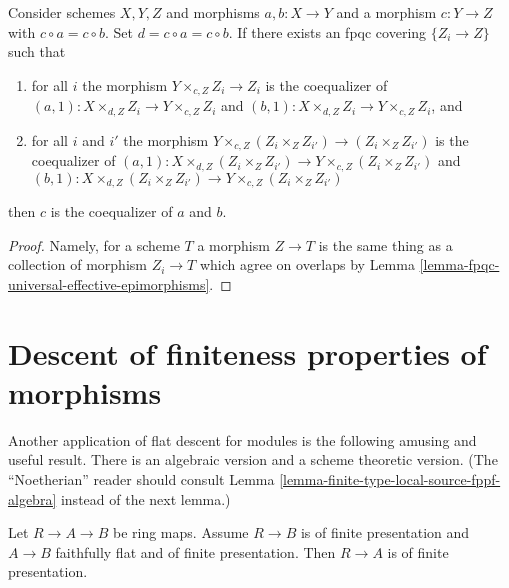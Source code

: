 \begin{lemma}
\label{lemma-coequalizer-fpqc-local}
Consider schemes $X, Y, Z$ and morphisms $a, b : X \to Y$ and
a morphism $c : Y \to Z$ with $c \circ a = c \circ b$. Set
$d = c \circ a = c \circ b$. If there exists an
fpqc covering $\{Z_i \to Z\}$ such that
\begin{enumerate}
\item for all $i$ the morphism $Y \times_{c, Z} Z_i \to Z_i$
is the coequalizer of $(a, 1) : X \times_{d, Z} Z_i \to Y \times_{c, Z} Z_i$
and $(b, 1) : X \times_{d, Z} Z_i \to Y \times_{c, Z} Z_i$, and
\item for all $i$ and $i'$ the morphism
$Y \times_{c, Z} (Z_i \times_Z Z_{i'}) \to (Z_i \times_Z Z_{i'})$
is the coequalizer of
$(a, 1) : X \times_{d, Z} (Z_i \times_Z Z_{i'}) \to
Y \times_{c, Z} (Z_i \times_Z Z_{i'})$ and
$(b, 1) : X \times_{d, Z} (Z_i \times_Z Z_{i'}) \to
Y \times_{c, Z} (Z_i \times_Z Z_{i'})$
\end{enumerate}
then $c$ is the coequalizer of $a$ and $b$.
\end{lemma}

\begin{proof}
Namely, for a scheme $T$ a morphism $Z \to T$ is the same thing as
a collection of morphism $Z_i \to T$ which agree on overlaps by
Lemma \ref{lemma-fpqc-universal-effective-epimorphisms}.
\end{proof}















\section{Descent of finiteness properties of morphisms}
\label{section-descent-finiteness-morphisms}

\noindent
Another application of flat descent for modules is the following
amusing and useful result. There is an algebraic version and a
scheme theoretic version. (The ``Noetherian'' reader should
consult Lemma \ref{lemma-finite-type-local-source-fppf-algebra}
instead of the next lemma.)

\begin{lemma}
\label{lemma-flat-finitely-presented-permanence-algebra}
Let $R \to A \to B$ be ring maps.
Assume $R \to B$ is of finite presentation and
$A \to B$ faithfully flat and of finite presentation.
Then $R \to A$ is of finite presentation.
\end{lemma}

